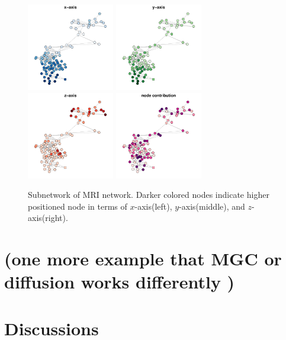 \documentclass[12pt]{article}
\theoremstyle{definition}
\begin{document}
\begin{figure}[H]
	\centering
		\label{fig:mri}
		\includegraphics[width=1.5in]{../Figure/brain1_x.pdf}
		\includegraphics[width=1.5in]{../Figure/brain1_y.pdf}
		\includegraphics[width=1.5in]{../Figure/brain1_z.pdf}
		\includegraphics[width=1.5in]{../Figure/brain1_weight.pdf}
	\caption{Subnetwork of MRI network. Darker colored nodes indicate higher positioned node in terms of $x$-axis(left), $y$-axis(middle), and $z$-axis(right).}
\end{figure}
	
	
\section{(one more example that MGC or diffusion  works differently )}	
	
\section{Discussions}
\label{sec:discussion}
	
\end{document}
